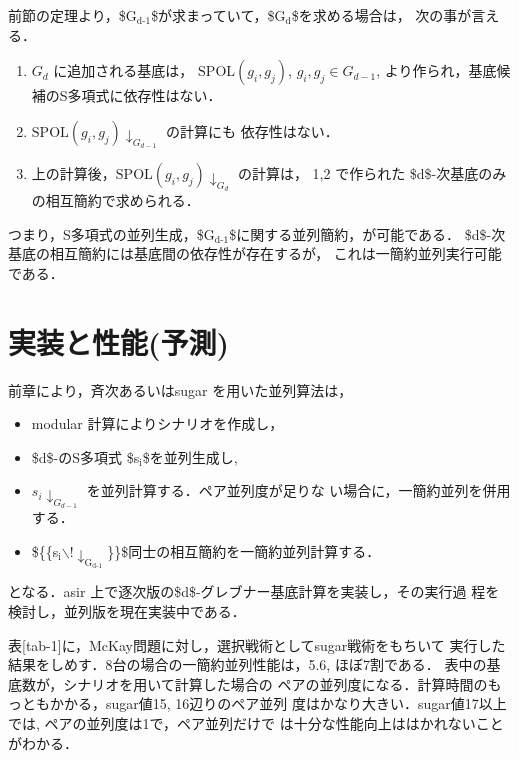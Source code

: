 \documentclass[a4j]{jarticle}
\begin{document}
{{前節の定理より，\$G\(_{\text{d-1}}\)\$が求まっていて，\$G\(_{\text{d}}\)\$を求める場合は，
次の事が言える．

\begin{enumerate}
\item \(G_d\) に追加される基底は， \({\mathrm{SPOL}}(g_i, g_j)\),
\(g_i, g_j \in G_{d-1}\), より作られ，基底候補のS多項式に依存性はない．

\item \({{{\mathrm{SPOL}}(g_i, g_j)\!\downarrow_{G_{d-1}}}}\) の計算にも
依存性はない．

\item 上の計算後，\({{{\mathrm{SPOL}}(g_i, g_j)\!\downarrow_{G_{d}}}}\)
の計算は， 1,2 で作られた \$d\$-次基底のみの相互簡約で求められる．
\end{enumerate}

つまり，S多項式の並列生成，\$G\(_{\text{d-1}}\)\$に関する並列簡約，が可能である．
\$d\$-次基底の相互簡約には基底間の依存性が存在するが，
これは一簡約並列実行可能である．

\section{実装と性能(予測)}
\label{sec:org08bd3e6}

前章により，斉次あるいはsugar を用いた並列算法は，

\begin{itemize}
\item modular 計算によりシナリオを作成し，

\item \$d\$-のS多項式 \$s\(_{\text{i}}\)\$を並列生成し,

\item \({{s_i\!\downarrow_{G_{d-1}}}}\) を並列計算する．ペア並列度が足りな
い場合に，一簡約並列を併用する．

\item \$\{\{s\(_{\text{i}}\)$\backslash$!\(\downarrow_{\text{G}_{\text{d-1}}}\)\}\}\$同士の相互簡約を一簡約並列計算する．
\end{itemize}

となる．asir 上で逐次版の\$d\$-グレブナー基底計算を実装し，その実行過
程を検討し，並列版を現在実装中である．

表[tab-1]に，McKay\cite{noro97-mckay}問題に対し，選択戦術としてsugar戦術をもちいて
実行した結果をしめす．8台の場合の一簡約並列性能は，5.6, ほぼ7割である．
表中の基底数が，シナリオを用いて計算した場合の
ペアの並列度になる．計算時間のもっともかかる，sugar値15,
16辺りのペア並列 度はかなり大きい．sugar値17以上では,
ペアの並列度は1で，ペア並列だけで
は十分な性能向上ははかれないことがわかる．

}}
\end{document}
